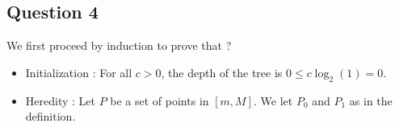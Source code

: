 \documentclass{cours}
\begin{document}
\subsection{Question 4}
We first proceed by induction to prove that ?
\begin{itemize}
    \item Initialization : For all $c > 0$, the depth of the tree is $0 \leq c\log_{2}(1) = 0$.
    \item Heredity : Let $P$ be a set of points in $\left[m, M\right]$. 
    We let $P_0$ and $P_{1}$ as in the definition. 

\end{itemize}
 
\end{document}
